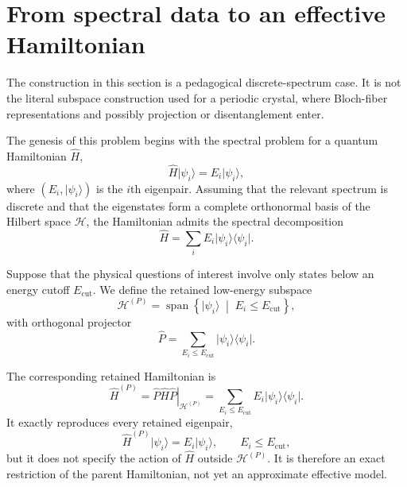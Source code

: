\section{From spectral data to an effective Hamiltonian}

The construction in this section is a pedagogical discrete-spectrum case. It
is not the literal subspace construction used for a periodic crystal, where
Bloch-fiber representations and possibly projection or disentanglement enter.

The genesis of this problem begins with the spectral problem for a quantum
Hamiltonian $\hat H$,
\begin{equation}
    \hat H\lvert\psi_i\rangle
    =
    E_i\lvert\psi_i\rangle,
\end{equation}
where $(E_i,\lvert\psi_i\rangle)$ is the $i$th eigenpair. Assuming that the
relevant spectrum is discrete and that the eigenstates form a complete
orthonormal basis of the Hilbert space $\mathcal H$, the Hamiltonian admits the
spectral decomposition
\begin{equation}
    \hat H
    =
    \sum_i
    E_i\lvert\psi_i\rangle\langle\psi_i\rvert.
\end{equation}

Suppose that the physical questions of interest involve only states below an
energy cutoff $E_{\mathrm{cut}}$. We define the retained low-energy subspace
\begin{equation}
    \mathcal H^{(P)}
    =
    \operatorname{span}
    \left\{
        \lvert\psi_i\rangle
        \;\middle|\;
        E_i\leq E_{\mathrm{cut}}
    \right\},
\end{equation}
with orthogonal projector
\begin{equation}
    \hat P
    =
    \sum_{E_i\leq E_{\mathrm{cut}}}
    \lvert\psi_i\rangle\langle\psi_i\rvert.
\end{equation}

The corresponding retained Hamiltonian is
\begin{equation}
    \hat H^{(P)}
    =
    \left.
        \hat P\hat H\hat P
    \right|_{\mathcal H^{(P)}}
    =
    \sum_{E_i\leq E_{\mathrm{cut}}}
    E_i\lvert\psi_i\rangle\langle\psi_i\rvert.
\end{equation}
It exactly reproduces every retained eigenpair,
\begin{equation}
    \hat H^{(P)}\lvert\psi_i\rangle
    =
    E_i\lvert\psi_i\rangle,
    \qquad
    E_i\leq E_{\mathrm{cut}},
\end{equation}
but it does not specify the action of $\hat H$ outside
$\mathcal H^{(P)}$. It is therefore an exact restriction of the parent
Hamiltonian, not yet an approximate effective model.

